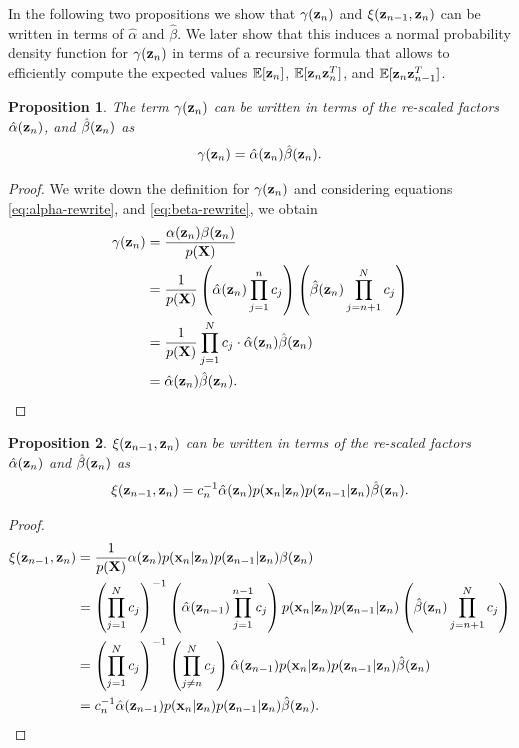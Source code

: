 \documentclass[12pt, oneside]{book}
\numberwithin{equation}{section}
\newcommand{\x}{{\bf x}}
\newcommand{\z}{{\bf z}}
\newtheorem{proposition}{Proposition}[section]
\begin{document}
{In the following two propositions we show that $\gamma(\z_n)$ and $\xi(\z_{n-1}, \z_{n})$ can be written in terms of $\hat\alpha$ and $\hat\beta$. We later show that this induces a normal probability density function for $\gamma(\z_n)$ in terms of a recursive formula that allows to efficiently compute the expected values $\mathbb{E}[\z_n]$, $\mathbb{E}[\z_n\z_{n}^{T}]$, and  $\mathbb{E}[\z_n\z_{n-1}^{T}]$.


\begin{proposition}\label{prop:gamma-rewrite-scaled}
	The term $\gamma(\z_n)$ can be written in terms of the re-scaled factors $\hat\alpha(\z_n)$, and $\hat\beta(\z_n)$ as
	\begin{equation}
		\gamma(\z_n) = \hat\alpha(\z_n)\hat\beta(\z_n).
	\end{equation}
\end{proposition}

\begin{proof} We write down the definition for $\gamma(\z_n)$ and considering equations \eqref{eq:alpha-rewrite}, and \eqref{eq:beta-rewrite}, we obtain
	\begin{align}
		\gamma(\z_n) &= \frac{\alpha(\z_n) \beta(\z_n)}{p({\bf X})} \\
		&= \frac{1}{p({\bf X})}\left(\hat\alpha(\z_n) \prod_{j=1}^n c_j\right)\left(\hat\beta(\z_n) \prod_{j={n+1}}^N c_j\right) \\
		&= \frac{1}{p(\bf X)} \prod_{j=1}^N c_j \cdot \hat\alpha(\z_n) \hat\beta(\z_n)\\
		&= \hat\alpha(\z_n) \hat\beta(\z_n).
	\end{align}
\end{proof}

\begin{proposition} \label{prop:xi-rewrite}
	$\xi(\z_{n-1}, \z_n)$ can be written in terms of the re-scaled factors $\hat\alpha(\z_n)$ and $\hat\beta(\z_n)$ as
	\begin{equation}
		\xi(\z_{n-1}, \z_{n}) = c_n^{-1}\hat\alpha(\z_n)p(\x_n \vert \z_n) p(\z_{n-1}\vert \z_n)\hat\beta(\z_n).
	\end{equation}
\end{proposition}

\begin{proof}
	\begin{align}
		\xi(\z_{n-1}, \z_n) &= \frac{1}{p({\bf X})} \alpha(\z_n) p(\x_n \vert \z_n) p(\z_{n-1} \vert \z_n) \beta(\z_n) \\
		&= \left(\prod_{j=1}^N c_j\right)^{-1} \left(\hat\alpha(\z_{n-1}) \prod_{j=1}^{n-1} c_j\right)p(\x_n \vert \z_n) p(\z_{n-1} \vert \z_n)\left(\hat\beta(\z_n) \prod_{j={n+1}}^N c_j\right) \\
		&= \left(\prod_{j=1}^N c_j\right)^{-1} \left(\prod_{j\neq n}^N c_j\right) \hat\alpha(\z_{n-1}) p(\x_n \vert \z_n) p(\z_{n-1} \vert \z_n) \hat\beta(\z_n)\\
		&= c_n^{-1}\hat\alpha(\z_{n-1}) p(\x_n \vert \z_n) p(\z_{n-1} \vert \z_n) \hat\beta(\z_n).
	\end{align}
\end{proof}

}
\end{document}
